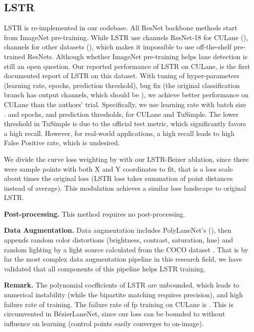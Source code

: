 \documentclass[10pt,twocolumn,letterpaper]{article}
\begin{document}
\subsection{LSTR}
\label{subsec:lstr}


LSTR \cite{liu2021end} is re-implemented in our codebase. All ResNet backbone methods start from ImageNet \cite{krizhevsky2012imagenet} pre-training. While LSTR \cite{liu2021end} use  channels ResNet-18 for CULane (),  channels for other datasets (), which makes it impossible to use off-the-shelf pre-trained ResNets. Although whether ImageNet pre-training helps lane detection is still an open question. Our reported performance of LSTR on CULane, is the first documented report of LSTR on this dataset. With tuning of hyper-parameters (learning rate, epochs, prediction threshold), bug fix (the original classification branch has  output channels, which should be ), we achieve  better performance on CULane than the authors' trial. Specifically, we use learning rate  with batch size .  and  epochs,  and  prediction thresholds, for CULane and TuSimple. The lower threshold in TuSimple is due to the official test metric, which significantly favors a high recall. However, for real-world applications, a high recall leads to high False Positive rate, which is undesired.

We divide the curve loss weighting by  with our LSTR-Beizer ablation, since there were  sample points with both X and Y coordinates to fit, that is a loss scale about  times the original loss (LSTR loss takes summation of point  distances instead of average). This modulation achieves a similar loss landscape to original LSTR.

\noindent \textbf{Post-processing.} This method requires no post-processing.

\noindent \textbf{Data Augmentation.} Data augmentation includes PolyLaneNet's (), then appends random color distortions (brightness, contrast, saturation, hue) and random lighting by a light source calculated from the COCO dataset \cite{lin2014microsoft}. That is by far the most complex data augmentation pipeline in this research field, we have validated that all components of this pipeline helps LSTR training.


\noindent \textbf{Remark.} The polynomial coefficients of LSTR are unbounded, which leads to numerical instability (while the bipartite matching requires precision), and high failure rate of training. The failure rate of fp training on CULane is . This is circumvented in BézierLaneNet, since our  loss can be bounded to  without influence on learning (control points easily converges to on-image).
\end{document}
